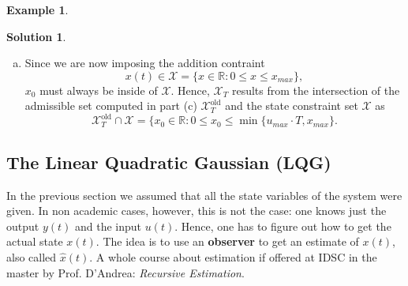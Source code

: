 \documentclass[a4paper,12 pt]{article}
\numberwithin{equation}{section}
\theoremstyle{definition}
\newtheorem{bsp}{Example}
\theoremstyle{remark}
\theoremstyle{definition}
\newtheorem*{lsg}{Solution}
\theoremstyle{definition}
\theoremstyle{definition}
\theoremstyle{remark}
\begin{document}
\begin{bsp}
\begin{lsg}
\begin{enumerate}[(a)]
\item Since we are now imposing the addition contraint 
\begin{equation*}
x(t)\in \mathcal{X}=\{x\in \mathbb{R}:0\leq x \leq x_{max}\},
\end{equation*}
$x_0$ must always be inside of $\mathcal{X}$. Hence, $\mathcal{X}_T$ results from the intersection of the admissible set computed in part (c) $\mathcal{X}_T^{\text{old}}$ and the state constraint set $\mathcal{X}$ as
\begin{equation*}
\mathcal{X}_T^\text{old}\cap \mathcal{X}=\{x_0\in \mathbb{R}:0\leq x_0 \leq \min\{u_{max}\cdot T,x_{max}\}.
\end{equation*}








\end{enumerate}

\end{lsg}


\end{bsp}
\newpage
\subsection{The Linear Quadratic Gaussian (LQG)}
In the previous section we assumed that all the state variables of the system were given. In non academic cases, however, this is not the case: one knows just the output $y(t)$ and the input $u(t)$. Hence, one has to figure out how to get the actual state $x(t)$. The idea is to use an \textbf{observer} to get an estimate of $x(t)$, also called $\hat{x}(t)$. A whole course about estimation if offered at IDSC in the master by Prof. D'Andrea: \textit{Recursive Estimation}.
\end{document}
